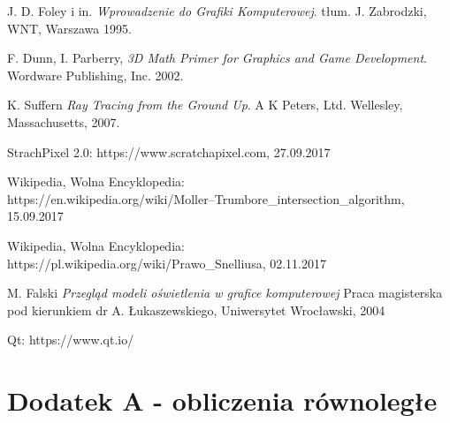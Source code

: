 \documentclass[12pt]{report}
\begin{document}
\begin{thebibliography}{9}

  J. D. Foley i in.
  \emph{Wprowadzenie do Grafiki Komputerowej}.
  tłum. J. Zabrodzki,
  WNT, Warszawa
  1995.
  
  F. Dunn, I. Parberry,
  \emph{3D Math Primer for Graphics and Game Development}.
  Wordware Publishing, Inc.
  2002.
  
	K. Suffern
	\emph{Ray Tracing from the Ground Up}.
	A K Peters, Ltd.
	Wellesley, Massachusetts,
	2007.
	
	StrachPixel 2.0:
	https://www.scratchapixel.com, 27.09.2017
	
	Wikipedia, Wolna Encyklopedia:\\ 
	https://en.wikipedia.org/wiki/Moller–Trumbore\_intersection\_algorithm, 15.09.2017
	
	
	Wikipedia, Wolna Encyklopedia:\\ 
	https://pl.wikipedia.org/wiki/Prawo\_Snelliusa,
	02.11.2017
	
	
	M. Falski
	\emph{Przegląd modeli oświetlenia w grafice komputerowej}
	Praca magisterska pod kierunkiem dr A. Łukaszewskiego,
	Uniwersytet Wrocławski,
	2004
	
	
	Qt: https://www.qt.io/

	
\end{thebibliography}

\listoffigures

\chapter{Dodatek A - obliczenia równoległe}
\end{document}
